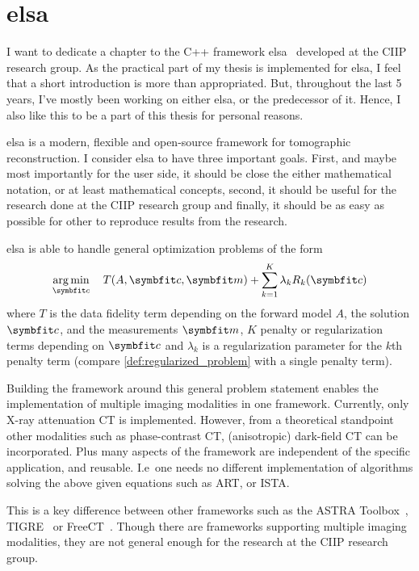 \chapter{elsa}\label{chap:elsa}

I want to dedicate a chapter to the C++ framework elsa~\cite{lasser_elsa_2019} developed at the
\gls{CIIP} research group. As the practical part of my thesis is implemented for elsa, I feel that a
short introduction is more than appropriated. But, throughout the last 5 years, I've mostly been
working on either elsa, or the predecessor of it. Hence, I also like this to be a part of this
thesis for personal reasons.

elsa is a modern, flexible and open-source framework for tomographic reconstruction. I consider elsa
to have three important goals. First, and maybe most importantly for the user side, it should be
close the either mathematical notation, or at least mathematical concepts, second, it should be
useful for the research done at the \gls{CIIP} research group and finally, it should be as easy as
possible for other to reproduce results from the research.

elsa is able to handle general optimization problems of the form
\[ \argmin_{\mvec{c}} \quad T(A, \mvec{c}, \mvec{m}) + \sum_{k=1}^K \lambda_k R_k(\mvec{c}) \]
where \(T\) is the data fidelity term depending on the forward model \(A\), the solution
\(\mvec{c}\), and the measurements \(\mvec{m}\), \(K\) penalty or regularization terms depending on
\(\mvec{c}\) and \(\lambda_k\) is a regularization parameter for the \(k\)th penalty term (compare
\autoref{def:regularized_problem} with a single penalty term).

Building the framework around this general problem statement enables the implementation of multiple
imaging modalities in one framework. Currently, only X-ray attenuation CT is implemented. However,
from a theoretical standpoint other modalities such as phase-contrast CT, (anisotropic) dark-field
CT can be incorporated. Plus many aspects of the framework are independent of the specific
application, and reusable. I.e\ one needs no different implementation of algorithms solving the
above given equations such as \gls{ART}, or \gls{ISTA}\@.

This is a key difference between other frameworks such as the ASTRA
Toolbox~\cite{van_aarle_fast_2016}, TIGRE~\cite{biguri_tigre_2016} or
FreeCT~\cite{hoffman_technical_2016}. Though there are frameworks supporting multiple imaging
modalities, they are not general enough for the research at the \gls{CIIP} research group.

